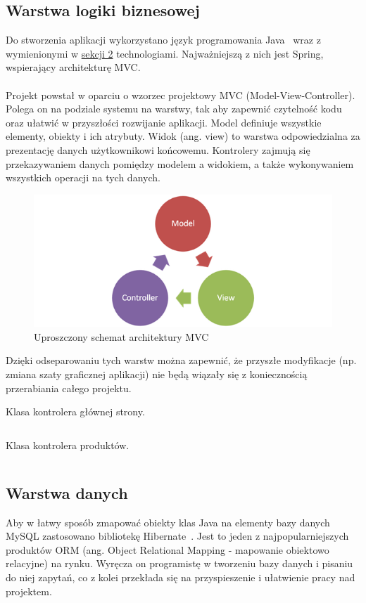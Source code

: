 \documentclass[12pt,a4paper,titlepage]{article}
\begin{document}
\subsection{Warstwa logiki biznesowej}
Do stworzenia aplikacji wykorzystano język programowania Java~\cite{openjdk-13} wraz z wymienionymi w \hyperref[sec:tech]{sekcji 2} technologiami. Najważniejszą z nich jest Spring, wspierający architekturę MVC.~\cite{mvc-tutorial} \\\\
Projekt powstał w oparciu o wzorzec projektowy MVC (Model-View-Controller). Polega on na podziale systemu na warstwy, tak aby zapewnić czytelność kodu oraz ułatwić w przyszłości rozwijanie aplikacji. Model definiuje wszystkie elementy, obiekty i ich atrybuty. Widok (ang. view) to warstwa odpowiedzialna za prezentację danych użytkownikowi końcowemu. Kontrolery zajmują się przekazywaniem danych pomiędzy modelem a widokiem, a także wykonywaniem wszystkich operacji na tych danych.
\begin{figure}[H]
    \centering
    \includegraphics{Pics/mvc.png}
    \caption{Uproszczony schemat architektury MVC}
\end{figure}
Dzięki odseparowaniu tych warstw można zapewnić, że przyszłe modyfikacje (np. zmiana szaty graficznej aplikacji) nie będą wiązały się z koniecznością przerabiania całego projektu.

\begin{listing}[H]
\caption{Klasa kontrolera głównej strony.}
\inputminted{java}{Code/HomeController.java}
\end{listing}

\begin{listing}[H]
\caption{Klasa kontrolera produktów.}
\inputminted{java}{Code/ProductController.java}
\end{listing}

\subsection{Warstwa danych}
Aby w łatwy sposób zmapować obiekty klas Java na elementy bazy danych MySQL zastosowano bibliotekę Hibernate~\cite{hibernate}. Jest to jeden z najpopularniejszych produktów ORM (ang. Object Relational Mapping - mapowanie obiektowo relacyjne) na rynku. Wyręcza on programistę w tworzeniu bazy danych i pisaniu do niej zapytań, co z kolei przekłada się na przyspieszenie i ułatwienie pracy nad projektem.
\end{document}
